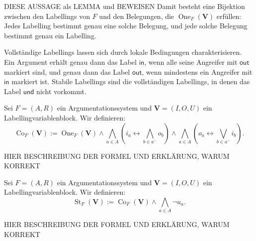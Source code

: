 DIESE AUSSAGE als LEMMA und BEWEISEN
Damit besteht eine Bijektion zwischen den Labellings von \(F\) und den
Belegungen, die \(\operatorname{One}_F(\mathbf V)\) erfüllen: Jedes
Labelling bestimmt genau eine solche Belegung, und jede solche Belegung
bestimmt genau ein Labelling.


Vollständige Labellings lassen sich durch lokale Bedingungen
charakterisieren. Ein Argument erhält genau dann das Label
\(\mathsf{in}\), wenn alle seine Angreifer mit \(\mathsf{out}\)
markiert sind, und genau dann das Label \(\mathsf{out}\), wenn mindestens
ein Angreifer mit \(\mathsf{in}\) markiert ist. Stabile Labellings sind
die vollständigen Labellings, in denen das Label \(\mathsf{und}\) nicht
vorkommt.
\begin{Definition}
    \label{def:co-st-encodings}
    Sei \(F=(A,R)\) ein Argumentationssystem und
    \(\mathbf V=(I,O,U)\) ein Labellingvariablenblock. Wir definieren:
    \[
        \operatorname{Co}_F(\mathbf V)
        :=
        \operatorname{One}_F(\mathbf V)
        \land
        \bigwedge_{a\in A}
        \left(
            i_a\leftrightarrow
            \bigwedge_{b\in a^-}o_b
        \right)
        \land
        \bigwedge_{a\in A}
        \left(
            o_a\leftrightarrow
            \bigvee_{b\in a^-}i_b
        \right).
    \]
\end{Definition}
HIER BESCHREIBUNG DER FORMEL UND ERKLÄRUNG, WARUM KORREKT
\begin{Definition}
    Sei \(F=(A,R)\) ein Argumentationssystem und
    \(\mathbf V=(I,O,U)\) ein Labellingvariablenblock. Wir definieren:
    \[
        \operatorname{St}_F(\mathbf V)
        :=
        \operatorname{Co}_F(\mathbf V)
        \land
        \bigwedge_{a\in A}\neg u_a.
    \]
\end{Definition}
HIER BESCHREIBUNG DER FORMEL UND ERKLÄRUNG, WARUM KORREKT

